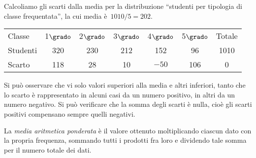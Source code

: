\begin{exrig}
\begin{esempio}
Calcoliamo gli scarti dalla media per la distribuzione ``studenti per 
tipologia di classe frequentata'', la cui media è~$1010/5 = 202$.
\begin{center}
\begin{tabular}{l*{6}{c}}
\toprule
Classe & 1$\grado$ & 2$\grado$ & 3$\grado$ & 4$\grado$ & 5$\grado$ & 
Totale\\
Studenti & 320& 230& 212& 152& 96& 1010 \\
Scarto & 118 & 28 & 10 & $-50$ & 106 & 0\\
\bottomrule
\end{tabular}
\end{center}
Si può osservare che vi solo valori superiori alla media e altri inferiori, 
tanto che lo scarto è rappresentato in
alcuni casi da un numero positivo, in altri da un numero negativo. Si può 
verificare che la somma degli scarti è nulla,
cioè gli scarti positivi compensano sempre quelli negativi.
 \end{esempio}
\end{exrig}

\begin{definizione}
La \emph{media aritmetica ponderata} è il valore ottenuto moltiplicando 
ciascun dato con la propria
frequenza, sommando tutti i prodotti fra loro e dividendo tale somma per il 
numero totale dei dati.
\end{definizione}

